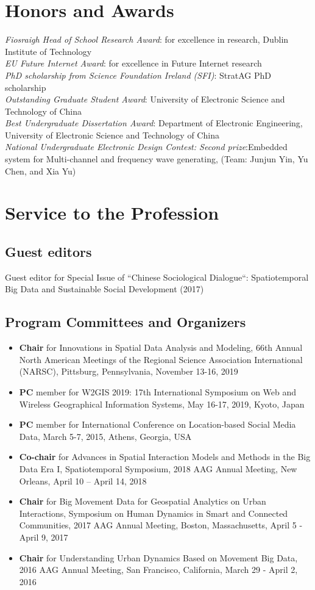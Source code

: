 \documentclass[11pt, a4paper]{article}
\newcommand{\years}[1]{\marginnote{\scriptsize #1}}
\begin{document}
\section*{Honors and Awards}
\noindent
\years{2013}\emph{Fiosraigh Head of School Research Award}: for excellence in research, Dublin Institute of Technology\\
\years{2013}\emph{EU Future Internet Award}: for excellence in Future Internet research\\
\years{2009}\emph{PhD scholarship from Science Foundation Ireland (SFI)}: StratAG PhD scholarship\\
\years{2006}\emph{Outstanding Graduate Student Award}: University of Electronic Science and Technology of China\\
\years{2006}\emph{Best Undergraduate Dissertation Award}: Department of Electronic Engineering, University of Electronic Science and Technology of China\\
\years{2005}\emph{National Undergraduate Electronic Design Contest: Second prize}:Embedded system for Multi-channel and frequency wave generating, (Team: Junjun Yin, Yu Chen, and Xia Yu)

\section*{Service to the Profession}
\subsection*{Guest editors}
Guest editor for Special Issue of ``Chinese Sociological Dialogue``: Spatiotemporal Big Data and Sustainable Social Development (2017)
\subsection*{Program Committees and Organizers}
\begin{itemize}
\item{\textbf{Chair} for Innovations in Spatial Data Analysis and Modeling, 66th Annual North American Meetings of the Regional Science Association International (NARSC), Pittsburg, Pennsylvania, November 13-16, 2019}
\item{\textbf{PC} member for W2GIS 2019: 17th International Symposium on Web and Wireless Geographical Information Systems, May 16-17, 2019, Kyoto, Japan}
\item{\textbf{PC} member for International Conference on Location-based Social Media Data, March 5-7, 2015, Athens, Georgia, USA}
\item{\textbf{Co-chair} for Advances in Spatial Interaction Models and Methods in the Big Data Era I, Spatiotemporal Symposium, 2018 AAG Annual Meeting, New Orleans, April 10 – April 14, 2018}
\item{\textbf{Chair} for Big Movement Data for Geospatial Analytics on Urban Interactions, Symposium on Human Dynamics in Smart and Connected Communities, 2017 AAG Annual Meeting, Boston, Massachusetts, April 5 - April 9, 2017}
\item{\textbf{Chair} for Understanding Urban Dynamics Based on Movement Big Data, 2016 AAG Annual Meeting, San Francisco, California, March 29 - April 2, 2016}
\end{itemize}
\end{document}
